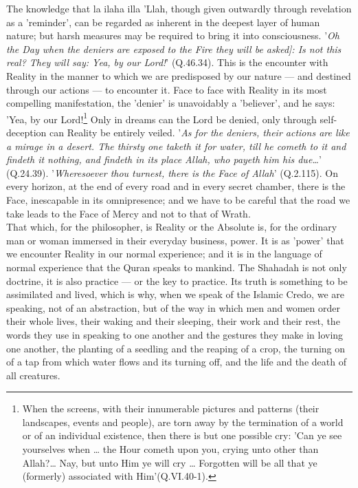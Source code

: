 \documentclass[11pt, b5paper, twoside]{book}
\begin{document}
The knowledge that la ilaha illa 'Llah, though given outwardly through revelation as a 'reminder', 
can be regarded as inherent in the deepest layer of human nature; but harsh measures may be required 
to bring it into consciousness. '\emph{Oh the Day when the deniers are exposed to the Fire they will be 
asked]: Is not this real? They will say: Yea, by our Lord!}' (Q.46.34). This is the encounter with 
Reality in the manner to which we are predisposed by our nature --- and destined through our actions --- 
to encounter it. Face to face with Reality in its most compelling manifestation, the 'denier' is 
unavoidably a 'believer', and he says: 'Yea, by our Lord!\footnote{When the screens, with their innumerable pictures and patterns (their landscapes, events and people), are torn away by the termination of a world or of an individual existence, then there is but one possible cry: 'Can ye see yourselves when \ldots{} the Hour cometh upon you, crying unto other than Allah?\ldots{} Nay, but unto Him ye will cry \ldots{} Forgotten will be all that ye (formerly) associated with Him'(Q.VI.40-1).} Only in dreams can the Lord be denied, only through self-deception can Reality be entirely veiled. '\emph{As for the deniers, their actions are like a mirage in a desert. The thirsty one taketh it for water, till he cometh to it and findeth it nothing, and findeth in its place Allah, who payeth him his due\ldots{}}' (Q.24.39). '\emph{Wheresoever thou turnest, there is the Face of Allah}' (Q.2.115). On every horizon, at the end of every road and in every secret chamber, there is the Face, inescapable in its omnipresence; and we have to be careful that the road we take leads to the Face of Mercy and not to that of Wrath. \\

That which, for the philosopher, is Reality or the Absolute is, for the ordinary man or woman 
immersed in their everyday business, power. It is as 'power' that we encounter Reality in our normal 
experience; and it is in the language of normal experience that the Quran speaks to mankind. The 
Shahadah is not only doctrine, it is also practice --- or the key to practice. Its truth is something 
to be assimilated and lived, which is why, when we speak of the Islamic Credo, we are speaking, not 
of an abstraction, but of the way in which men and women order their whole lives, their waking and 
their sleeping, their work and their rest, the words they use in speaking to one another and the 
gestures they make in loving one another, the planting of a seedling and the reaping of a crop, the 
turning on of a tap from which water flows and its turning off, and the life and the death of all 
creatures. \\
\end{document}
